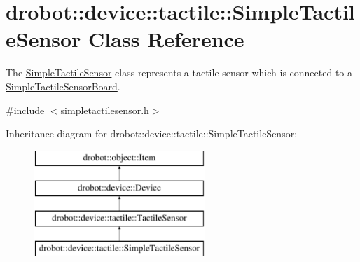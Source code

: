 \hypertarget{classdrobot_1_1device_1_1tactile_1_1SimpleTactileSensor}{\section{drobot\-:\-:device\-:\-:tactile\-:\-:Simple\-Tactile\-Sensor Class Reference}
\label{classdrobot_1_1device_1_1tactile_1_1SimpleTactileSensor}
}


The \hyperlink{classdrobot_1_1device_1_1tactile_1_1SimpleTactileSensor}{Simple\-Tactile\-Sensor} class represents a tactile sensor which is connected to a \hyperlink{classdrobot_1_1device_1_1tactile_1_1SimpleTactileSensorBoard}{Simple\-Tactile\-Sensor\-Board}.  




{\ttfamily \#include $<$simpletactilesensor.\-h$>$}

Inheritance diagram for drobot\-:\-:device\-:\-:tactile\-:\-:Simple\-Tactile\-Sensor\-:\begin{figure}[H]
\begin{center}
\leavevmode
\includegraphics[height=4.000000cm]{classdrobot_1_1device_1_1tactile_1_1SimpleTactileSensor}
\end{center}
\end{figure}
